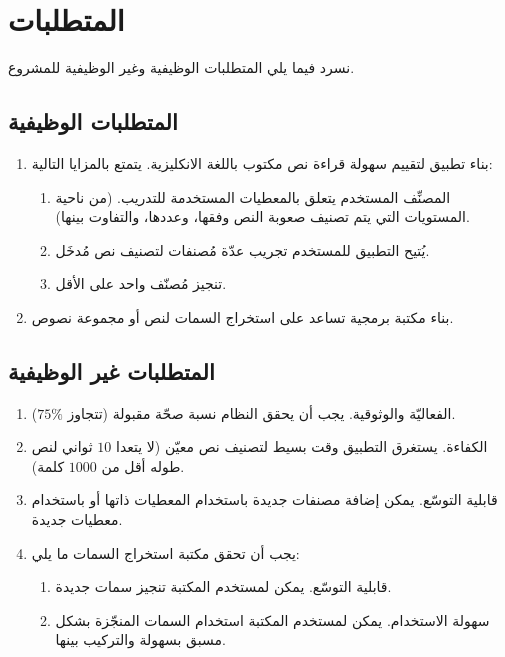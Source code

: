 \section{المتطلبات}
نسرد فيما يلي المتطلبات الوظيفية وغير الوظيفية للمشروع.

\subsection{المتطلبات الوظيفية}

\begin{enumerate}
	\item 
	بناء تطبيق لتقييم سهولة قراءة نص مكتوب باللغة الانكليزية. يتمتع بالمزايا التالية:
	\begin{enumerate}
		\item 
		المصنِّف المستخدم يتعلق بالمعطيات المستخدمة للتدريب.
		(من ناحية المستويات التي يتم تصنيف صعوبة النص وفقها، وعددها، والتفاوت بينها).
		\item 
		يُتيح التطبيق للمستخدم تجريب عدّة مُصنفات لتصنيف نص مُدخَل.
		\item 
		تنجيز مُصنّف واحد على الأقل.
	\end{enumerate}

	\item 
	بناء مكتبة برمجية تساعد على استخراج السمات لنص أو مجموعة نصوص.
\end{enumerate}




\subsection{المتطلبات غير الوظيفية}
\begin{enumerate}
	\item 
	الفعاليّة والوثوقية. يجب أن يحقق النظام نسبة صحّة مقبولة (تتجاوز $75\%$).
	\item 
	الكفاءة. يستغرق التطبيق وقت بسيط لتصنيف نص معيّن (لا يتعدا $10$ ثواني لنص طوله أقل من $1000$ كلمة).
	\item 
	قابلية التوسّع. يمكن إضافة مصنفات جديدة باستخدام المعطيات ذاتها أو باستخدام معطيات جديدة.
	\item 
	يجب أن تحقق مكتبة استخراج السمات ما يلي:
	\begin{enumerate}
		\item 
		قابلية التوسّع. يمكن لمستخدم المكتبة تنجيز سمات جديدة.
		\item
		سهولة الاستخدام. يمكن لمستخدم المكتبة استخدام السمات المنجّزة بشكل مسبق بسهولة والتركيب بينها.
	\end{enumerate}

\end{enumerate}



